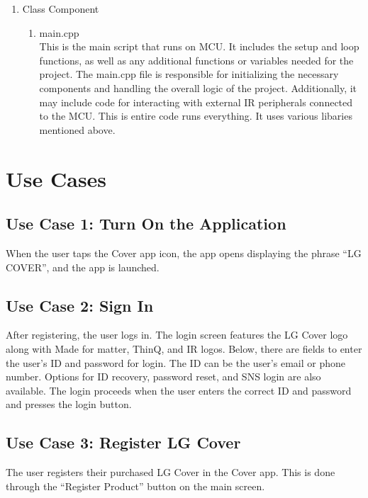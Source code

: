 \documentclass[conference]{IEEEtran}
\begin{document}
\begin{enumerate}[label=\arabic*.]
\item Class Component\\
\begin{enumerate}[label=\alph*.]
\item main.cpp\\
This is the main script that runs on MCU. It includes the setup and loop functions, as well as any additional functions or variables needed for the project. The main.cpp file is responsible for initializing the necessary components and handling the overall logic of the project. Additionally, it may include code for interacting with external IR peripherals connected to the MCU. This is entire code runs everything. It uses various libaries mentioned above.\\
\end{enumerate}

\end{enumerate} %



\section{\large{Use Cases}}
\subsection{\large{Use Case 1: Turn On the Application}}
When the user taps the Cover app icon, the app opens displaying the phrase “LG COVER”, and the app is launched.\\

\subsection{\large{Use Case 2: Sign In}}
After registering, the user logs in. The login screen features the LG Cover logo along with Made for matter, ThinQ, and IR logos. Below, there are fields to enter the user's ID and password for login. The ID can be the user's email or phone number. Options for ID recovery, password reset, and SNS login are also available. The login proceeds when the user enters the correct ID and password and presses the login button.\\

\subsection{\large{Use Case 3: Register LG Cover}}
The user registers their purchased LG Cover in the Cover app. This is done through the “Register Product” button on the main screen.\\
\end{document}
